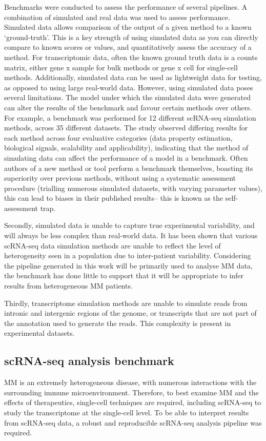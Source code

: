 Benchmarks were conducted to assess the performance of several pipelines.
A combination of simulated and real data was used to assess performance.
Simulated data allows comparison of the output of a given method to a known `ground-truth'.
This is a key strength of using simulated data as you can directly compare to known scores or values, and quantitatively assess the accuracy of a method.
For transcriptomic data, often the known ground truth data is a counts matrix, either gene x sample for bulk methods or gene x cell for single-cell methods.
Additionally, simulated data can be used as lightweight data for testing, as opposed to using large real-world data.
However, using simulated data poses several limitations.
The model under which the simulated data were generated can alter the results of the benchmark and favour certain methods over others.
For example, a benchmark was performed for 12 different scRNA-seq simulation methods, across 35 different datasets\cite{cao2021benchmark}.
The study observed differing results for each method across four evaluative categories (data property estimation, biological signals, scalability and applicability), indicating that the method of simulating data can affect the performance of a model in a benchmark\cite{cao2021benchmark}.
Often authors of a new method or tool perform a benchmark themselves, boasting its superiority over previous methods, without using a systematic assessment procedure (trialling numerous simulated datasets, with varying parameter values), this can lead to biases in their published results-- this is known as the self-assessment trap\cite{mangul2019systematic}.

Secondly, simulated data is unable to capture true experimental variability, and will always be less complex than real-world data\cite{mangul2019systematic}.
It has been shown that various scRNA-seq data simulation methods are unable to reflect the level of heterogeneity seen in a population due to inter-patient variability\cite{cao2021benchmark}.
Considering the pipeline generated in this work will be primarily used to analyse MM data, the benchmark has done little to support that it will be appropriate to infer results from heterogeneous MM patients.

Thirdly, transcriptome simulation methods are unable to simulate reads from intronic and intergenic regions of the genome, or transcripts that are not part of the annotation used to generate the reads.
This complexity is present in experimental datasets.


\subsection{scRNA-seq analysis benchmark}
MM is an extremely heterogeneous disease, with numerous interactions with the surrounding immune microenvironment.
Therefore, to best examine MM and the effects of therapeutics, single-cell techniques are required, including scRNA-seq to study the transcriptome at the single-cell level.
To be able to interpret results from scRNA-seq data, a robust and reproducible scRNA-seq analysis pipeline was required.

